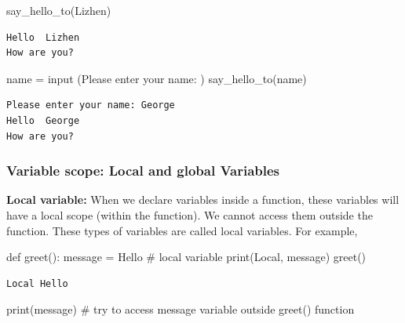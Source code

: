\documentclass[
  letterpaper,
  DIV=11,
  numbers=noendperiod]{scrreprt}
\newenvironment{Shaded}{\begin{snugshade}}{\end{snugshade}}
\newcommand{\BuiltInTok}[1]{\textcolor[rgb]{0.00,0.23,0.31}{#1}}
\newcommand{\CommentTok}[1]{\textcolor[rgb]{0.37,0.37,0.37}{#1}}
\newcommand{\KeywordTok}[1]{\textcolor[rgb]{0.00,0.23,0.31}{#1}}
\newcommand{\NormalTok}[1]{\textcolor[rgb]{0.00,0.23,0.31}{#1}}
\newcommand{\OperatorTok}[1]{\textcolor[rgb]{0.37,0.37,0.37}{#1}}
\newcommand{\StringTok}[1]{\textcolor[rgb]{0.13,0.47,0.30}{#1}}
\begin{document}
\begin{Shaded}
\begin{Highlighting}[]
\NormalTok{say\_hello\_to(}\StringTok{\textquotesingle{}Lizhen\textquotesingle{}}\NormalTok{)}
\end{Highlighting}
\end{Shaded}

\begin{verbatim}
Hello  Lizhen
How are you?
\end{verbatim}

\begin{Shaded}
\begin{Highlighting}[]
\NormalTok{name }\OperatorTok{=} \BuiltInTok{input}\NormalTok{ (}\StringTok{\textquotesingle{}Please enter your name: \textquotesingle{}}\NormalTok{)}
\NormalTok{say\_hello\_to(name)}
\end{Highlighting}
\end{Shaded}

\begin{verbatim}
Please enter your name: George
Hello  George
How are you?
\end{verbatim}

\hypertarget{variable-scope-local-and-global-variables}{%
\subsubsection{Variable scope: Local and global
Variables}\label{variable-scope-local-and-global-variables}}

\textbf{Local variable:} When we declare variables inside a function,
these variables will have a local scope (within the function). We cannot
access them outside the function. These types of variables are called
local variables. For example,

\begin{Shaded}
\begin{Highlighting}[]
\KeywordTok{def}\NormalTok{ greet(): }
\NormalTok{    message }\OperatorTok{=} \StringTok{\textquotesingle{}Hello\textquotesingle{}}  \CommentTok{\# local variable}
    \BuiltInTok{print}\NormalTok{(}\StringTok{\textquotesingle{}Local\textquotesingle{}}\NormalTok{, message)}
\NormalTok{greet()}
\end{Highlighting}
\end{Shaded}

\begin{verbatim}
Local Hello
\end{verbatim}

\begin{Shaded}
\begin{Highlighting}[]
\BuiltInTok{print}\NormalTok{(message) }\CommentTok{\# try to access message variable outside greet() function}
\end{Highlighting}
\end{Shaded}
\end{document}
